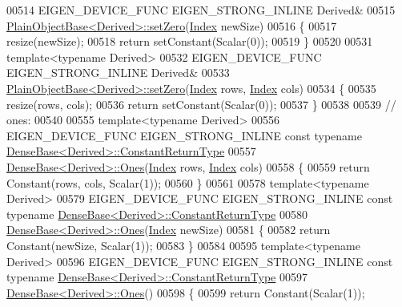 \begin{DoxyCode}
00514 EIGEN\_DEVICE\_FUNC EIGEN\_STRONG\_INLINE Derived&
00515 \hyperlink{class_eigen_1_1_plain_object_base_ac21ad5f989f320e46958b75ac8d9a1da}{PlainObjectBase<Derived>::setZero}(\hyperlink{namespace_eigen_a62e77e0933482dafde8fe197d9a2cfde}{Index} newSize)
00516 \{
00517   resize(newSize);
00518   \textcolor{keywordflow}{return} setConstant(Scalar(0));
00519 \}
00520 
00531 \textcolor{keyword}{template}<\textcolor{keyword}{typename} Derived>
00532 EIGEN\_DEVICE\_FUNC EIGEN\_STRONG\_INLINE Derived&
00533 \hyperlink{class_eigen_1_1_plain_object_base_ac21ad5f989f320e46958b75ac8d9a1da}{PlainObjectBase<Derived>::setZero}(\hyperlink{namespace_eigen_a62e77e0933482dafde8fe197d9a2cfde}{Index} rows, 
      \hyperlink{namespace_eigen_a62e77e0933482dafde8fe197d9a2cfde}{Index} cols)
00534 \{
00535   resize(rows, cols);
00536   \textcolor{keywordflow}{return} setConstant(Scalar(0));
00537 \}
00538 
00539 \textcolor{comment}{// ones:}
00540 
00555 \textcolor{keyword}{template}<\textcolor{keyword}{typename} Derived>
00556 EIGEN\_DEVICE\_FUNC EIGEN\_STRONG\_INLINE \textcolor{keyword}{const} \textcolor{keyword}{typename} 
      \hyperlink{group___core___module_class_eigen_1_1_cwise_nullary_op}{DenseBase<Derived>::ConstantReturnType}
00557 \hyperlink{group___core___module_a1284a38971d817c33e40c226f6347e37}{DenseBase<Derived>::Ones}(\hyperlink{namespace_eigen_a62e77e0933482dafde8fe197d9a2cfde}{Index} rows, \hyperlink{namespace_eigen_a62e77e0933482dafde8fe197d9a2cfde}{Index} cols)
00558 \{
00559   \textcolor{keywordflow}{return} Constant(rows, cols, Scalar(1));
00560 \}
00561 
00578 \textcolor{keyword}{template}<\textcolor{keyword}{typename} Derived>
00579 EIGEN\_DEVICE\_FUNC EIGEN\_STRONG\_INLINE \textcolor{keyword}{const} \textcolor{keyword}{typename} 
      \hyperlink{group___core___module_class_eigen_1_1_cwise_nullary_op}{DenseBase<Derived>::ConstantReturnType}
00580 \hyperlink{group___core___module_a1284a38971d817c33e40c226f6347e37}{DenseBase<Derived>::Ones}(\hyperlink{namespace_eigen_a62e77e0933482dafde8fe197d9a2cfde}{Index} newSize)
00581 \{
00582   \textcolor{keywordflow}{return} Constant(newSize, Scalar(1));
00583 \}
00584 
00595 \textcolor{keyword}{template}<\textcolor{keyword}{typename} Derived>
00596 EIGEN\_DEVICE\_FUNC EIGEN\_STRONG\_INLINE \textcolor{keyword}{const} \textcolor{keyword}{typename} 
      \hyperlink{group___core___module_class_eigen_1_1_cwise_nullary_op}{DenseBase<Derived>::ConstantReturnType}
00597 \hyperlink{group___core___module_a1284a38971d817c33e40c226f6347e37}{DenseBase<Derived>::Ones}()
00598 \{
00599   \textcolor{keywordflow}{return} Constant(Scalar(1));

\end{DoxyCode}

